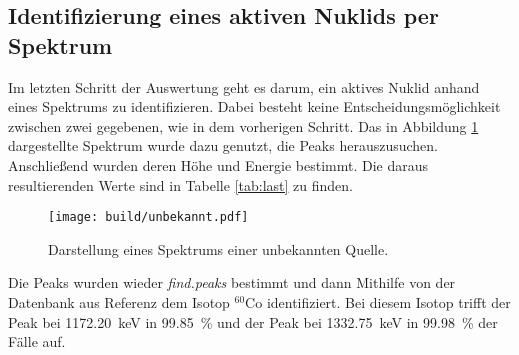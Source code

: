 \subsection{Identifizierung eines aktiven Nuklids per Spektrum}
\label{sec:Nuklidbestimmung}
Im letzten Schritt der Auswertung geht es darum, ein aktives Nuklid anhand eines
Spektrums zu identifizieren. Dabei besteht keine Entscheidungsmöglichkeit zwischen
zwei gegebenen, wie in dem vorherigen Schritt.
Das in Abbildung \ref{plt:unbekannt} dargestellte Spektrum wurde dazu genutzt, die Peaks herauszusuchen.
Anschließend wurden deren Höhe und Energie bestimmt. Die daraus
resultierenden Werte sind in Tabelle \ref{tab:last} zu finden.

\begin{figure}[htb]
  \centering
  \texttt{[image: build/unbekannt.pdf]}
  \caption{Darstellung eines Spektrums einer unbekannten Quelle.}
  \label{plt:unbekannt}
\end{figure}
Die Peaks wurden wieder  \textit{find.peaks} bestimmt und dann Mithilfe von der
Datenbank aus Referenz \cite{referenz} dem Isotop $^{60}\text{Co}$ identifiziert.
Bei diesem Isotop trifft der Peak bei \SI{1172.20}{\kilo\electronvolt} in
\SI{99.85}{\percent} und der Peak bei \SI{1332.75}{\kilo\electronvolt} in
\SI{99.98}{\percent} der Fälle auf.

